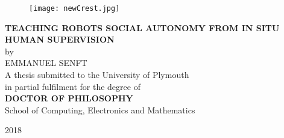 \begin{center}
\begin{figure}[h]
\centering
\texttt{[image: newCrest.jpg]}
\end{figure}
\vspace{56pt}
\LARGE 
\textbf{TEACHING ROBOTS SOCIAL AUTONOMY FROM IN SITU HUMAN SUPERVISION}
\\
\vspace{20pt}
\Large by
\\
\vspace{20pt}
\LARGE 
EMMANUEL SENFT
\\
\vspace{68pt}
\Large 
A thesis submitted to the University of Plymouth
\\
in partial fulfilment for the degree of
\vspace{36pt}
\\
\textbf{DOCTOR OF PHILOSOPHY}
\vspace{36pt}
\\
School of Computing, Electronics and Mathematics\\

\vspace{46pt}

\vspace{36pt}
2018
\end{center}

\normalsize
